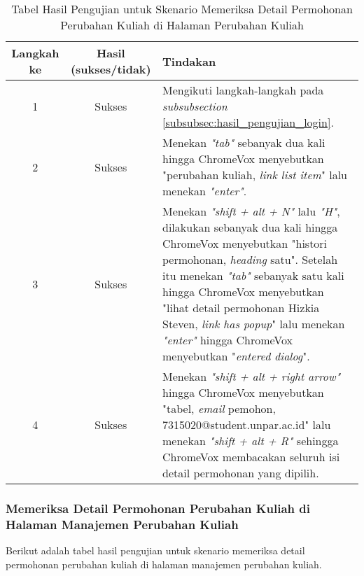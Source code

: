 \begin{table}[H]
    \centering 
    \caption{Tabel Hasil Pengujian untuk Skenario Memeriksa Detail Permohonan Perubahan Kuliah di Halaman Perubahan Kuliah}
    \label{tab:hasil_pengujian_memeriksa_detail_permohonan_perubahan_kuliah_di_halaman_perubahan_kuliah}
    \begin{tabular}{|c|c|p{10cm}|}
        \toprule
        Langkah ke & Hasil (sukses/tidak) & Tindakan \\

        \midrule
        1 & Sukses & Mengikuti langkah-langkah pada \textit{subsubsection} \ref{subsubsec:hasil_pengujian_login}. \\
        2 & Sukses & Menekan \textit{"tab"} sebanyak dua kali hingga ChromeVox menyebutkan "perubahan kuliah, \textit{link list item}" lalu menekan \textit{"enter"}. \\
        3 & Sukses & Menekan \textit{"shift + alt + N"} lalu \textit{"H"}, dilakukan sebanyak dua kali hingga ChromeVox menyebutkan "histori permohonan, \textit{heading} satu". Setelah itu menekan \textit{"tab"} sebanyak satu kali hingga ChromeVox menyebutkan "lihat detail permohonan Hizkia Steven, \textit{link has popup}" lalu menekan \textit{"enter"} hingga ChromeVox menyebutkan "\textit{entered dialog}". \\
        4 & Sukses & Menekan \textit{"shift + alt + right arrow"} hingga ChromeVox menyebutkan "tabel, \textit{email} pemohon, 7315020@student.unpar.ac.id" lalu menekan \textit{"shift + alt + R"} sehingga ChromeVox membacakan seluruh isi detail permohonan yang dipilih. \\

        \bottomrule

    \end{tabular}
\end{table}

\subsubsection{Memeriksa Detail Permohonan Perubahan Kuliah di Halaman Manajemen Perubahan Kuliah}
\label{subsubsec:hasil_pengujian_memeriksa_detail_permohonan_perubahan_kuliah_di_halaman_manajemen_perubahan_kuliah}
Berikut adalah tabel hasil pengujian untuk skenario memeriksa detail permohonan perubahan kuliah di halaman manajemen perubahan kuliah.

